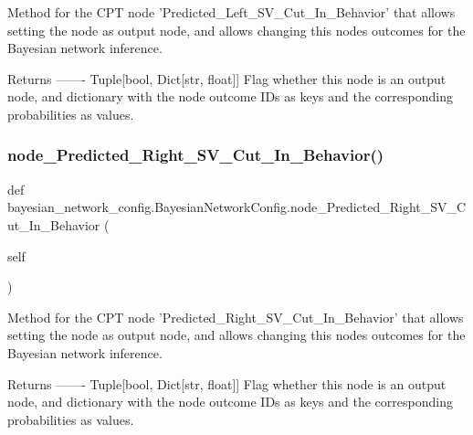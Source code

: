 \begin{DoxyVerb}Method for the CPT node 'Predicted_Left_SV_Cut_In_Behavior' that allows setting the node as output node,
and allows changing this nodes outcomes for the Bayesian network inference.

Returns
-------
Tuple[bool, Dict[str, float]]
    Flag whether this node is an output node, and dictionary with the node outcome IDs as keys 
    and the corresponding probabilities as values.
\end{DoxyVerb}
 \mbox{\label{classbayesian__network__config_1_1_bayesian_network_config_a7563ca52e9383e33c2d97b8c26c923d8}} 
\subsubsection{\texorpdfstring{node\+\_\+\+Predicted\+\_\+\+Right\+\_\+\+S\+V\+\_\+\+Cut\+\_\+\+In\+\_\+\+Behavior()}{node\_Predicted\_Right\_SV\_Cut\_In\_Behavior()}}
{\footnotesize\ttfamily def bayesian\+\_\+network\+\_\+config.\+Bayesian\+Network\+Config.\+node\+\_\+\+Predicted\+\_\+\+Right\+\_\+\+S\+V\+\_\+\+Cut\+\_\+\+In\+\_\+\+Behavior (\begin{DoxyParamCaption}\item[{}]{self }\end{DoxyParamCaption})}

\begin{DoxyVerb}Method for the CPT node 'Predicted_Right_SV_Cut_In_Behavior' that allows setting the node as output node,
and allows changing this nodes outcomes for the Bayesian network inference.

Returns
-------
Tuple[bool, Dict[str, float]]
    Flag whether this node is an output node, and dictionary with the node outcome IDs as keys
    and the corresponding probabilities as values.
\end{DoxyVerb}
 \mbox{\label{classbayesian__network__config_1_1_bayesian_network_config_a27d247927ce168025568fdf0d467b78d}} 
